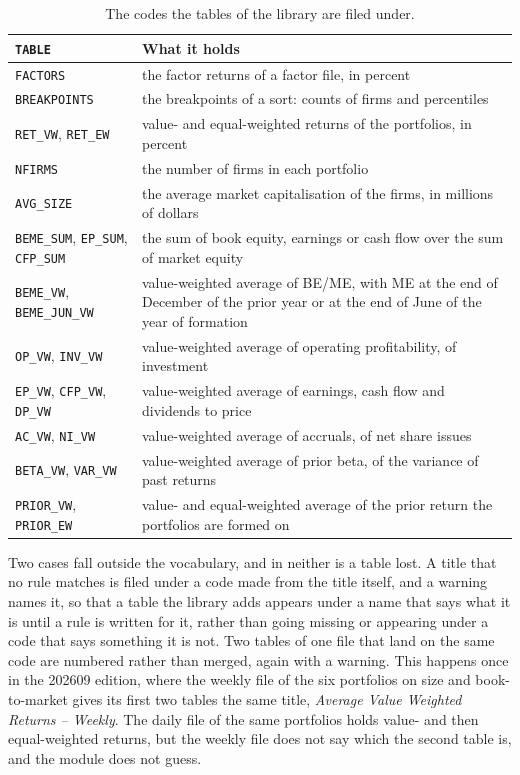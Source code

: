 \begin{table}[h!]
	\centering
	\small
	\begin{tabular}{p{4.6cm}p{10cm}}
		\hline
		\verb|TABLE| & What it holds \\
		\hline
		\verb|FACTORS| & the factor returns of a factor file, in percent \\
		\verb|BREAKPOINTS| & the breakpoints of a sort: counts of firms and percentiles \\
		\verb|RET_VW|, \verb|RET_EW| & value- and equal-weighted returns of the portfolios, in percent \\
		\verb|NFIRMS| & the number of firms in each portfolio \\
		\verb|AVG_SIZE| & the average market capitalisation of the firms, in millions of dollars \\
		\verb|BEME_SUM|, \verb|EP_SUM|, \verb|CFP_SUM| & the sum of book equity, earnings or cash flow over the sum of market equity \\
		\verb|BEME_VW|, \verb|BEME_JUN_VW| & value-weighted average of BE/ME, with ME at the end of December of the prior year or at the end of June of the year of formation \\
		\verb|OP_VW|, \verb|INV_VW| & value-weighted average of operating profitability, of investment \\
		\verb|EP_VW|, \verb|CFP_VW|, \verb|DP_VW| & value-weighted average of earnings, cash flow and dividends to price \\
		\verb|AC_VW|, \verb|NI_VW| & value-weighted average of accruals, of net share issues \\
		\verb|BETA_VW|, \verb|VAR_VW| & value-weighted average of prior beta, of the variance of past returns \\
		\verb|PRIOR_VW|, \verb|PRIOR_EW| & value- and equal-weighted average of the prior return the portfolios are formed on \\
		\hline
	\end{tabular}
	\caption{The codes the tables of the library are filed under.\label{tab:frenchdatalibrary-codes}}
\end{table}

Two cases fall outside the vocabulary, and in neither is a table lost. A title that no rule matches is filed under a code made from the title itself, and a warning names it, so that a table the library adds appears under a name that says what it is until a rule is written for it, rather than going missing or appearing under a code that says something it is not. Two tables of one file that land on the same code are numbered rather than merged, again with a warning. This happens once in the 202609 edition, where the weekly file of the six portfolios on size and book-to-market gives its first two tables the same title, \emph{Average Value Weighted Returns -- Weekly}. The daily file of the same portfolios holds value- and then equal-weighted returns, but the weekly file does not say which the second table is, and the module does not guess.

